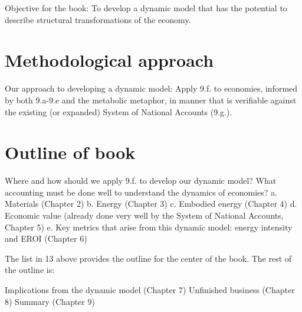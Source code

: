 Objective for the book: 
To develop a dynamic model that has the potential to describe structural transformations of the economy. 

\section{Methodological approach}
\label{sec:approach}

Our approach to developing a dynamic model: 
Apply 9.f. to economies, informed by both 9.a-9.e and the metabolic metaphor, 
in manner that is verifiable against the existing (or expanded) System of National Accounts (9.g.).

\section{Outline of book}
\label{sec:outline}

Where and how should we apply 9.f. to develop our dynamic model? 
What accounting must be done well to understand the dynamics of economies?
     a.    Materials (Chapter 2)
     b.    Energy (Chapter 3)
     c.    Embodied energy (Chapter 4)
     d.    Economic value (already done very well by the System of National Accounts, Chapter 5)
     e.    Key metrics that arise from this dynamic model: energy intensity and EROI (Chapter 6)


The list in 13 above provides the outline for the center of the book.  The rest of the outline is:

Implications from the dynamic model (Chapter 7) Unfinished business (Chapter 8) Summary (Chapter 9)








%
%

